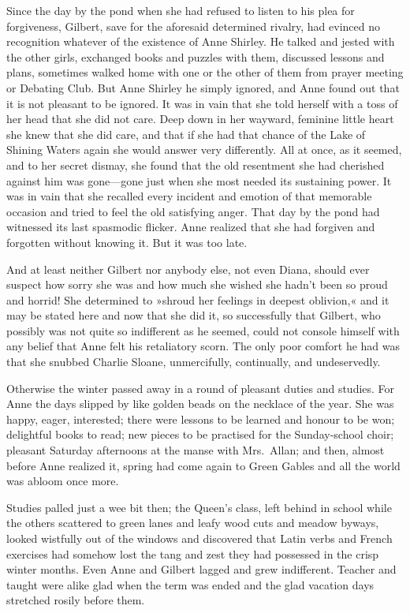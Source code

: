 Since the day by the pond when she had refused to listen to his plea for forgiveness, Gilbert, save for the aforesaid determined rivalry, had evinced no recognition whatever of the existence of Anne Shirley. He talked and jested with the other girls, exchanged books and puzzles with them, discussed lessons and plans, sometimes walked home with one or the other of them from prayer meeting or Debating Club. But Anne Shirley he simply ignored, and Anne found out that it is not pleasant to be ignored. It was in vain that she told herself with a toss of her head that she did not care. Deep down in her wayward, feminine little heart she knew that she did care, and that if she had that chance of the Lake of Shining Waters again she would answer very differently. All at once, as it seemed, and to her secret dismay, she found that the old resentment she had cherished against him was gone—gone just when she most needed its sustaining power. It was in vain that she recalled every incident and emotion of that memorable occasion and tried to feel the old satisfying anger. That day by the pond had witnessed its last spasmodic flicker. Anne realized that she had forgiven and forgotten without knowing it. But it was too late.

And at least neither Gilbert nor anybody else, not even Diana, should ever suspect how sorry she was and how much she wished she hadn't been so proud and horrid! She determined to »shroud her feelings in deepest oblivion,« and it may be stated here and now that she did it, so successfully that Gilbert, who possibly was not quite so indifferent as he seemed, could not console himself with any belief that Anne felt his retaliatory scorn. The only poor comfort he had was that she snubbed Charlie Sloane, unmercifully, continually, and undeservedly.

Otherwise the winter passed away in a round of pleasant duties and studies. For Anne the days slipped by like golden beads on the necklace of the year. She was happy, eager, interested; there were lessons to be learned and honour to be won; delightful books to read; new pieces to be practised for the Sunday-school choir; pleasant Saturday afternoons at the manse with Mrs.~Allan; and then, almost before Anne realized it, spring had come again to Green Gables and all the world was abloom once more.

Studies palled just a wee bit then; the Queen's class, left behind in school while the others scattered to green lanes and leafy wood cuts and meadow byways, looked wistfully out of the windows and discovered that Latin verbs and French exercises had somehow lost the tang and zest they had possessed in the crisp winter months. Even Anne and Gilbert lagged and grew indifferent. Teacher and taught were alike glad when the term was ended and the glad vacation days stretched rosily before them.

